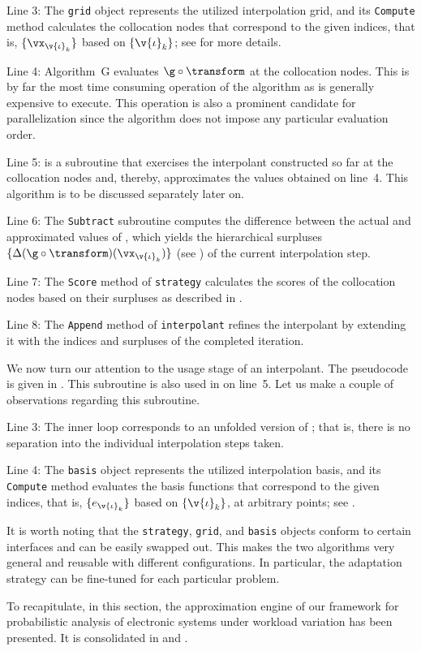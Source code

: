 Line 3: The \texttt{grid} object represents the utilized interpolation grid, and
its \texttt{Compute} method calculates the collocation nodes that correspond to
the given indices, that is, $\{ \vx_{\v{\iota}_k} \}$ based on $\{ \v{\iota}_k
\}$; see  for more details.

Line 4: Algorithm~G evaluates $\g \circ \transform$ at the collocation nodes.
This is by far the most time consuming operation of the algorithm as \g is
generally expensive to execute. This operation is also a prominent candidate for
parallelization since the algorithm does not impose any particular evaluation
order.

Line 5:  is a subroutine that exercises the interpolant
constructed so far at the collocation nodes and, thereby, approximates the
values obtained on line~4. This algorithm is to be discussed separately later
on.

Line 6: The \texttt{Subtract} subroutine computes the difference between the
actual and approximated values of \g, which yields the hierarchical surpluses
$\{ \Delta(\g \circ \transform)(\vx_{\v{\iota}_k}) \}$ (see
) of the current interpolation step.

Line 7: The \texttt{Score} method of \texttt{strategy} calculates the scores of
the collocation nodes based on their surpluses as described in
.

Line 8: The \texttt{Append} method of \texttt{interpolant} refines the
interpolant by extending it with the indices and surpluses of the completed
iteration.

We now turn our attention to the usage stage of an interpolant. The pseudocode
is given in . This subroutine is also used in
 on line~5. Let us make a couple of observations
regarding this subroutine.

Line 3: The inner loop corresponds to an unfolded version of
; that is, there is no separation into the individual
interpolation steps taken.

Line 4: The \texttt{basis} object represents the utilized interpolation basis,
and its \texttt{Compute} method evaluates the basis functions that correspond to
the given indices, that is, $\{ e_{\v{\iota}_k} \}$ based on $\{ \v{\iota}_k
\}$, at arbitrary points; see .

It is worth noting that the \texttt{strategy}, \texttt{grid}, and \texttt{basis}
objects conform to certain interfaces and can be easily swapped out. This makes
the two algorithms very general and reusable with different configurations. In
particular, the adaptation strategy can be fine-tuned for each particular
problem.

\conclusioncut
To recapitulate, in this section, the approximation engine of our framework for
probabilistic analysis of electronic systems under workload variation has been
presented. It is consolidated in  and
.

